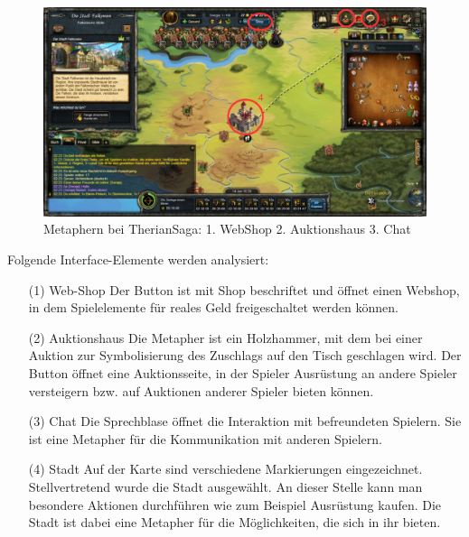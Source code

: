\documentclass[a4paper,10pt]{article}
\begin{document}
\begin{figure}[ht]
\centering \includegraphics[width=1\textwidth]{onlinegame.jpg}
\caption{Metaphern bei TherianSaga: 1. WebShop 2. Auktionshaus 3. Chat}
\end{figure}
Folgende Interface-Elemente werden analysiert:
\begin{enumerate}
\item[(1)] Web-Shop
	Der Button ist mit Shop beschriftet und öffnet einen Webshop, in dem Spielelemente für reales 		Geld freigeschaltet werden können.
\item[(2)] Auktionshaus
	Die Metapher ist ein Holzhammer, mit dem bei einer Auktion zur Symbolisierung des Zuschlags auf 	den Tisch geschlagen wird. Der Button öffnet eine Auktionsseite, in der Spieler 					Ausrüstung an andere Spieler versteigern bzw. auf Auktionen anderer Spieler bieten können.
\item[(3)] Chat
	Die Sprechblase öffnet die Interaktion mit befreundeten Spielern. Sie ist eine Metapher für die 	Kommunikation mit anderen Spielern.
\item[(4)] Stadt
	Auf der Karte sind verschiedene Markierungen eingezeichnet. Stellvertretend wurde die Stadt 		ausgewählt. An dieser Stelle kann man besondere Aktionen durchführen wie zum Beispiel 				Ausrüstung kaufen. Die Stadt ist dabei eine Metapher für die Möglichkeiten, die sich in ihr bieten.
\end{enumerate}
\end{document}
